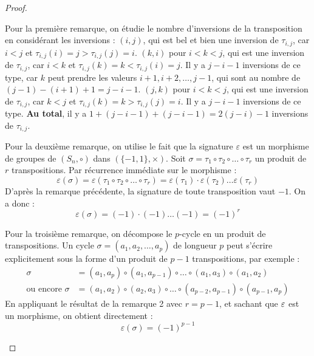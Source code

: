 \documentclass[12pt, a4paper]{report}
\begin{document}
\begin{proof}
    \begin{outline}
        \1 Pour la première remarque, on étudie le nombre d'inversions de la transposition en considérant les inversions :
        \2 $(i,j)$, qui est bel et bien une inversion de $\tau_{i,j}$, car $i < j$ et $\tau_{i,j}(i) = j > \tau_{i,j}(j) = i$.
        \2 $(k,i)$ pour $i < k < j$, qui est une inversion de $\tau_{i,j}$, car $i < k$ et $\tau_{i,j}(k) = k < \tau_{i,j}(i) = j$. Il y a $j - i - 1$ inversions de ce type, car $k$ peut prendre les valeurs $i+1, i+2, \dots, j-1$, qui sont au nombre de $(j-1) - (i+1) + 1 = j - i - 1$.
        \2 $(j,k)$ pour $i < k < j$, qui est une inversion de $\tau_{i,j}$, car $k < j$ et $\tau_{i,j}(k) = k > \tau_{i,j}(j) = i$. Il y a $j - i - 1$ inversions de ce type.
        \2 \textbf{Au total}, il y a $1 + (j - i - 1) + (j - i - 1) = 2(j - i) - 1$ inversions de $\tau_{i,j}$.
        
        \1 Pour la deuxième remarque, on utilise le fait que la signature $\varepsilon$ est un morphisme de groupes de $(S_n, \circ)$ dans $(\{-1, 1\}, \times)$.
        \2 Soit $\sigma = \tau_1 \circ \tau_2 \circ \dots \circ \tau_r$ un produit de $r$ transpositions. Par récurrence immédiate sur le morphisme :
        $$\varepsilon(\sigma) = \varepsilon(\tau_1 \circ \tau_2 \circ \dots \circ \tau_r) = \varepsilon(\tau_1) \cdot \varepsilon(\tau_2) \dots \varepsilon(\tau_r)$$
        \2 D'après la remarque précédente, la signature de toute transposition vaut $-1$. On a donc :
        $$\varepsilon(\sigma) = (-1) \cdot (-1) \dots (-1) = (-1)^r$$

        \1 Pour la troisième remarque, on décompose le $p$-cycle en un produit de transpositions.
        \2 Un cycle $\sigma = (a_1, a_2, \dots, a_p)$ de longueur $p$ peut s'écrire explicitement sous la forme d'un produit de $p-1$ transpositions, par exemple :
        \begin{align*}
            \sigma &= (a_1, a_p) \circ (a_1, a_{p-1}) \circ \dots \circ (a_1, a_3) \circ (a_1, a_2) \\
            \text{ou encore } \sigma &= (a_1, a_2) \circ (a_2, a_3) \circ \dots \circ (a_{p-2}, a_{p-1}) \circ (a_{p-1}, a_p)
        \end{align*}
        \2 En appliquant le résultat de la remarque 2 avec $r = p - 1$, et sachant que $\varepsilon$ est un morphisme, on obtient directement :
        $$\varepsilon(\sigma) = (-1)^{p-1}$$

    \end{outline}
\end{proof}
\end{document}
